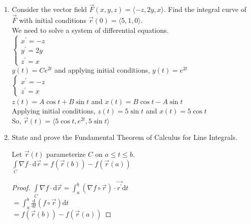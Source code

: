 \begin{enumerate}
	\item Consider the vector field $\vec{F}(x,y,z) = \langle -z, 2y, x \rangle$. Find the integral curve of $\vec{F}$ with initial conditions $\vec{r}(0) = \langle 5, 1, 0\rangle$.\\
	\indent
	We need to solve a system of differential equations.\\
	$\begin{cases}
		x^\prime = -z \\
		y^\prime = 2y \\
		z^\prime = x
	\end{cases}$\\
	$y(t) = Ce^{2t}$ and applying initial conditions, $y(t) = e^{2t}$\\
	$\begin{cases}
		x^\prime = -z \\
		z^\prime = x
	\end{cases}$\\
	$z(t) = A\cos{t} + B\sin{t}$ and $x(t) = B\cos{t} - A\sin{t}$\\
	Applying initial conditions, $z(t) = 5\sin{t}$ and $x(t) = 5\cos{t}$\\
	So, $\vec{r}(t) = \langle 5\cos{t}, e^{2t}, 5\sin{t}\rangle$\\
	
	\item State and prove the Fundamental Theorem of Calculus for Line Integrals.\\
	\indent
	\begin{theorem}
		Let $\vec{r}(t)$ parameterize $C$ on $a \leq t \leq b$.\\
		$\int\limits_{C}{\nabla f \cdot \mathrm{d}\vec{r}} = f(\vec{r}(b)) - f(\vec{r}(a))$
	\end{theorem}
	\begin{proof}
		$\int\limits_{C}{\nabla f \cdot \mathrm{d}\vec{r}} = \int_{a}^{b}{(\nabla f\circ\vec{r}) \cdot \vec{r^\prime}\mathrm{d}t}$\\
		$= \int_{a}^{b}{\frac{\mathrm{d}}{\mathrm{d}t}(f\circ\vec{r})\mathrm{d}t}$\\
		$= f(\vec{r}(b)) - f(\vec{r}(a))$
	\end{proof}
\end{enumerate}